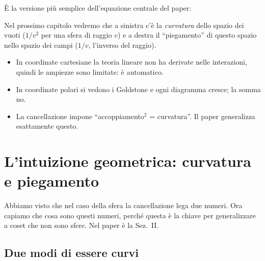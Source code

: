 \documentclass[11pt,a4paper]{article}
\numberwithin{equation}{section}
\theoremstyle{remark}
\begin{document}
È la versione più semplice dell'equazione centrale del paper:
\begin{center}
\end{center}
Nel prossimo capitolo vedremo che a sinistra c'è la \emph{curvatura} dello spazio dei vuoti ($1/v^2$ per una sfera di raggio $v$) e a destra il ``piegamento'' di questo spazio nello spazio dei campi ($1/v$, l'inverso del raggio).

\begin{porta}
\begin{itemize}[nosep]
\item In coordinate cartesiane la teoria lineare non ha derivate nelle interazioni, quindi le ampiezze sono limitate: è automatico.
\item In coordinate polari si vedono i Goldstone e ogni diagramma cresce; la somma no.
\item La cancellazione impone ``accoppiamento$^2$ = curvatura''. Il paper generalizza esattamente questo.
\end{itemize}
\end{porta}

\section{L'intuizione geometrica: curvatura e piegamento}
\label{cap:geo}

\begin{dove}
Abbiamo visto che nel caso della sfera la cancellazione lega due numeri. Ora capiamo che cosa sono questi numeri, perché questa è la chiave per generalizzare a coset che non sono sfere. Nel paper è la Sez.~II.
\end{dove}

\subsection{Due modi di essere curvi}

\begin{center}
\end{center}
\end{document}
